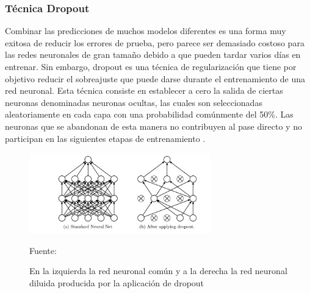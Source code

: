 		\vskip 0.4cm 
	\subsubsection {Técnica Dropout}
		
		Combinar las predicciones de muchos modelos diferentes es una forma muy exitosa de reducir los errores de prueba, pero parece ser demasiado costoso para las redes neuronales de gran tamaño debido a que pueden tardar varios días en entrenar. Sin embargo, dropout es una técnica de regularización que tiene por objetivo reducir el sobreajuste que puede darse durante el entrenamiento de una red neuronal. Esta técnica consiste en establecer a cero la salida de ciertas neuronas denominadas neuronas ocultas, las cuales son seleccionadas aleatoriamente en cada capa con una probabilidad comúnmente del 50\%. Las neuronas que se abandonan de esta manera no contribuyen al pase directo y no participan en las siguientes etapas de entrenamiento \citep{AulaDNN}.

		\begin{figure}[H]
		\begin{center}
		\includegraphics[width=0.7\textwidth]{images/marcoteorico/dropout_sample}
		\end{center}
		\begin{center}
		\caption{\small{En la izquierda la red neuronal común y a la derecha la red neuronal diluida producida por la aplicación de dropout}}
		{\small{Fuente: \cite{AulaDNN}}}
		\end{center}
		\vspace{-1.5em}
		\end{figure}
		

